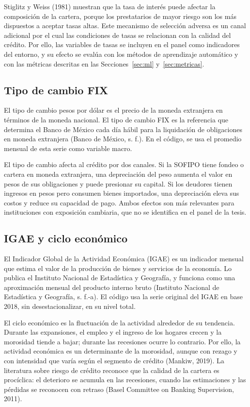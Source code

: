 Stiglitz y Weiss (1981) muestran que la tasa de interés puede afectar la composición de la cartera, porque los prestatarios de mayor riesgo son los más dispuestos a aceptar tasas altas. Este mecanismo de selección adversa es un canal adicional por el cual las condiciones de tasas se relacionan con la calidad del crédito. Por ello, las variables de tasas se incluyen en el panel como indicadores del entorno, y su efecto se evalúa con los métodos de aprendizaje automático y con las métricas descritas en las Secciones~\ref{sec:ml} y~\ref{sec:metricas}.

\subsection{Tipo de cambio FIX}
El tipo de cambio pesos por dólar es el precio de la moneda extranjera en términos de la moneda nacional. El tipo de cambio FIX es la referencia que determina el Banco de México cada día hábil para la liquidación de obligaciones en moneda extranjera (Banco de México, s. f.). En el código, se usa el promedio mensual de esta serie como variable macro.

El tipo de cambio afecta al crédito por dos canales. Si la SOFIPO tiene fondeo o cartera en moneda extranjera, una depreciación del peso aumenta el valor en pesos de sus obligaciones y puede presionar su capital. Si los deudores tienen ingresos en pesos pero consumen bienes importados, una depreciación eleva sus costos y reduce su capacidad de pago. Ambos efectos son más relevantes para instituciones con exposición cambiaria, que no se identifica en el panel de la tesis. %

\subsection{IGAE y ciclo económico}
El Indicador Global de la Actividad Económica (IGAE) es un indicador mensual que estima el valor de la producción de bienes y servicios de la economía. Lo publica el Instituto Nacional de Estadística y Geografía, y funciona como una aproximación mensual del producto interno bruto (Instituto Nacional de Estadística y Geografía, s. f.-a). El código usa la serie original del IGAE en base 2018, sin desestacionalizar, en su nivel total.

El ciclo económico es la fluctuación de la actividad alrededor de su tendencia. Durante las expansiones, el empleo y el ingreso de los hogares crecen y la morosidad tiende a bajar; durante las recesiones ocurre lo contrario. Por ello, la actividad económica es un determinante de la morosidad, aunque con rezago y con intensidad que varía según el segmento de crédito (Mankiw, 2019). La literatura sobre riesgo de crédito reconoce que la calidad de la cartera es procíclica: el deterioro se acumula en las recesiones, cuando las estimaciones y las pérdidas se reconocen con retraso (Basel Committee on Banking Supervision, 2011).

